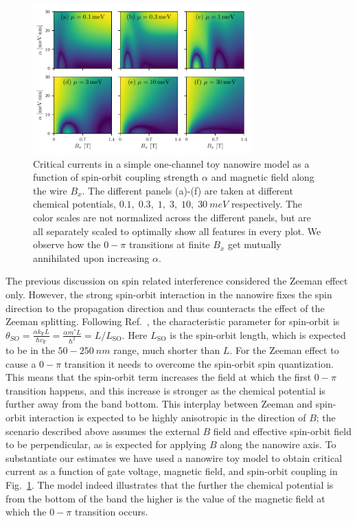 \begin{figure}
\centering
\includegraphics[width=0.75\textwidth]{chapter_supercurrent/figures/sup_fig7}
\caption{Critical currents in a simple one-channel toy nanowire model\cite{Lutchyn2010,Oreg2010} as a function of spin-orbit coupling strength $\alpha$ and magnetic field along the wire $B_x$.
The different panels (a)-(f) are taken at different chemical potentials, $0.1,\; 0.3,\; 1,\; 3,\; 10,\; \SI{30}{meV}$ respectively.
The color scales are not normalized across the different panels, but are all separately scaled to optimally show all features in every plot.
We observe how the $0-\pi$ transitions at finite $B_x$ get mutually annihilated upon increasing $\alpha$.\label{fig:currents_1D_alpha_vs_B_x}}
\end{figure}

The previous discussion on spin related interference considered the Zeeman effect only.
However, the strong spin-orbit interaction in the nanowire fixes the spin direction to the propagation direction and thus counteracts the effect of the Zeeman splitting.
Following Ref.~\cite{Yokoyama2014}, the characteristic parameter for spin-orbit is $\theta_{SO} = \frac{\alpha k_\mathrm{F} L}{\hbar v_\mathrm{F}} = \frac{\alpha m^* L}{\hbar^2} = L/L_\mathrm{SO}$.
Here $L_\mathrm{SO}$ is the spin-orbit length, which is expected to be in the $50-\SI{250}{nm}$ range, much shorter than $L$.
For the Zeeman effect to cause a $0-\pi$ transition it needs to overcome the spin-orbit spin quantization.
This means that the spin-orbit term increases the field at which the first $0-\pi$ transition happens, and this increase is stronger as the chemical potential is further away from the band bottom.
This interplay between Zeeman and spin-orbit interaction is expected to be highly anisotropic\cite{Yokoyama2014} in the direction of $B$; the scenario described above assumes the external $B$ field and effective spin-orbit field to be perpendicular, as is expected for applying $B$ along the nanowire axis.
To substantiate our estimates we have used a nanowire toy model\cite{Lutchyn2010,Oreg2010} to obtain critical current as a function of gate voltage, magnetic field, and spin-orbit coupling in Fig.~\ref{fig:currents_1D_alpha_vs_B_x}.
The model indeed illustrates that the further the chemical potential is from the bottom of the band the higher is the value of the magnetic field at which the $0-\pi$ transition occurs.

